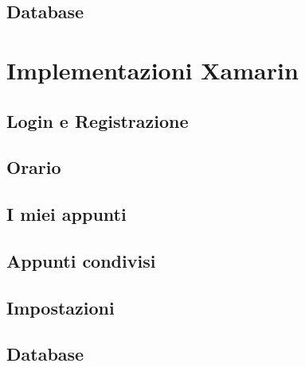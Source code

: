 \documentclass[a4paper, 50pt, twoside]{article}
\begin{document}
\subsection{Database}

\section{Implementazioni Xamarin}
\subsection{Login e Registrazione}
\subsection{Orario}
\subsection{I miei appunti}
\subsection{Appunti condivisi}
\subsection{Impostazioni}
\subsection{Database}
\end{document}
